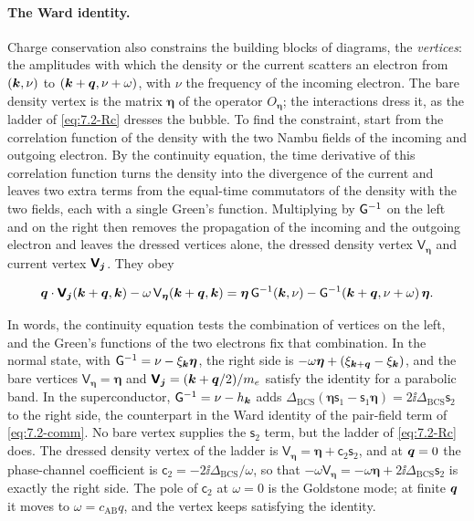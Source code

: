 \paragraph{The Ward identity.} Charge conservation also constrains the building blocks of diagrams, the \emph{vertices}: the amplitudes with which the density or the current scatters an electron from $(\bm{k}, \nu)$ to $(\bm{k}+\bm{q}, \nu + \omega)$, with $\nu$ the frequency of the incoming electron. The bare density vertex is the matrix $\boldsymbol{\eta}$ of the operator $O_{\boldsymbol{\eta}}$; the interactions dress it, as the ladder of \cref{eq:7.2-Rc} dresses the bubble. To find the constraint, start from the correlation function of the density with the two Nambu fields of the incoming and outgoing electron. By the continuity equation, the time derivative of this correlation function turns the density into the divergence of the current and leaves two extra terms from the equal-time commutators of the density with the two fields, each with a single Green's function. Multiplying by $\mathsf{G}^{-1}$ on the left and on the right then removes the propagation of the incoming and the outgoing electron and leaves the dressed vertices alone, the dressed density vertex $\mathsf{V}_{\boldsymbol{\eta}}$ and current vertex $\boldsymbol{\mathsf{V}}_{\bm{j}}$. They obey
\begin{keyresult}
\begin{equation}
  \bm{q}\cdot\boldsymbol{\mathsf{V}}_{\bm{j}}(\bm{k}+\bm{q},\bm{k}) - \omega\,\mathsf{V}_{\boldsymbol{\eta}}(\bm{k}+\bm{q},\bm{k}) = \boldsymbol{\eta}\,\mathsf{G}^{-1}(\bm{k},\nu) - \mathsf{G}^{-1}(\bm{k}+\bm{q},\nu + \omega)\,\boldsymbol{\eta} .
  \label{eq:7.2-ward}
\end{equation}
\end{keyresult}
In words, the continuity equation tests the combination of vertices on the left, and the Green's functions of the two electrons fix that combination. In the normal state, with $\mathsf{G}^{-1} = \nu - \xi_{\bm{k}}\boldsymbol{\eta}$, the right side is $-\omega\boldsymbol{\eta} + (\xi_{\bm{k}+\bm{q}} - \xi_{\bm{k}})$, and the bare vertices $\mathsf{V}_{\boldsymbol{\eta}} = \boldsymbol{\eta}$ and $\boldsymbol{\mathsf{V}}_{\bm{j}} = (\bm{k} + \bm{q}/2)/m_e$ satisfy the identity for a parabolic band. In the superconductor, $\mathsf{G}^{-1} = \nu - h_{\bm{k}}$ adds $\Delta_{\mathrm{BCS}}(\boldsymbol{\eta}\mathsf{s}_1 - \mathsf{s}_1\boldsymbol{\eta}) = 2\ii\Delta_{\mathrm{BCS}}\mathsf{s}_2$ to the right side, the counterpart in the Ward identity of the pair-field term of \cref{eq:7.2-comm}. No bare vertex supplies the $\mathsf{s}_2$ term, but the ladder of \cref{eq:7.2-Rc} does. The dressed density vertex of the ladder is $\mathsf{V}_{\boldsymbol{\eta}} = \boldsymbol{\eta} + \mathsf{c}_2\mathsf{s}_2$, and at $\bm{q} = 0$ the phase-channel coefficient is $\mathsf{c}_2 = -2\ii\Delta_{\mathrm{BCS}}/\omega$, so that $-\omega\mathsf{V}_{\boldsymbol{\eta}} = -\omega\boldsymbol{\eta} + 2\ii\Delta_{\mathrm{BCS}}\mathsf{s}_2$ is exactly the right side. The pole of $\mathsf{c}_2$ at $\omega = 0$ is the Goldstone mode; at finite $\bm{q}$ it moves to $\omega = c_{\mathrm{AB}}q$, and the vertex keeps satisfying the identity.

